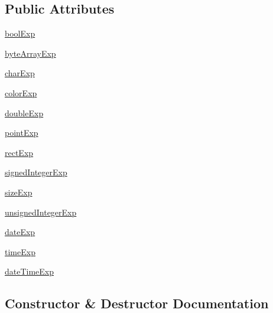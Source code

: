 \subsection*{Public Attributes}
\begin{DoxyCompactItemize}
\item 
\hyperlink{classsettingseditor_1_1VariantDelegate_a776f0346401676e8c24ee4164b2693ae}{bool\+Exp}
\item 
\hyperlink{classsettingseditor_1_1VariantDelegate_a832ac3f6785f0e67df59df72490cc1e0}{byte\+Array\+Exp}
\item 
\hyperlink{classsettingseditor_1_1VariantDelegate_a77294467aa8dd1da94358fdab2eba8c9}{char\+Exp}
\item 
\hyperlink{classsettingseditor_1_1VariantDelegate_ac7796f39e6f6871723d1bba5f2bbd366}{color\+Exp}
\item 
\hyperlink{classsettingseditor_1_1VariantDelegate_a16255445853f654108a4dc756d968bfd}{double\+Exp}
\item 
\hyperlink{classsettingseditor_1_1VariantDelegate_ac3f28e6363fdfd576ef0d10f3e4178af}{point\+Exp}
\item 
\hyperlink{classsettingseditor_1_1VariantDelegate_a5650a42070b962f452062d9ab936f2c9}{rect\+Exp}
\item 
\hyperlink{classsettingseditor_1_1VariantDelegate_aa8566ff1bdf443625ace76fd1de8874a}{signed\+Integer\+Exp}
\item 
\hyperlink{classsettingseditor_1_1VariantDelegate_a264f15b067307607fb008c14168736fd}{size\+Exp}
\item 
\hyperlink{classsettingseditor_1_1VariantDelegate_ab76abc86170c0ff9342b64506a17d667}{unsigned\+Integer\+Exp}
\item 
\hyperlink{classsettingseditor_1_1VariantDelegate_a6e58c58bae2a5343711bc193c2136696}{date\+Exp}
\item 
\hyperlink{classsettingseditor_1_1VariantDelegate_a6a8e24c1509a9f03462602efc4456a81}{time\+Exp}
\item 
\hyperlink{classsettingseditor_1_1VariantDelegate_aedd56c1237f8301770ce8bced58e576f}{date\+Time\+Exp}
\end{DoxyCompactItemize}


\subsection{Constructor \& Destructor Documentation}
\hypertarget{classsettingseditor_1_1VariantDelegate_a045b1b6fcd2d5daf88e3f8cb16a41fcf}{}

